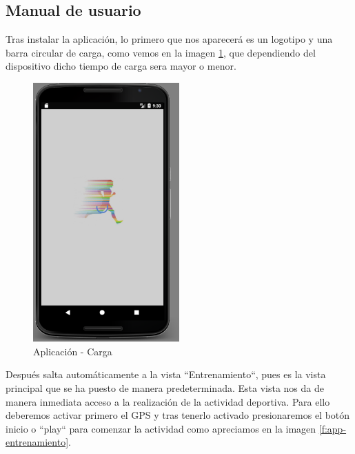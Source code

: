 \documentclass[a4paper, 11pt]{article}
\begin{document}
\begin{itemize}
\section{Manual de usuario}

  Tras instalar la aplicación, lo primero que nos aparecerá es un logotipo y una
  barra circular de carga, como vemos en la imagen  \ref{f:app-inicio}, que dependiendo
  del dispositivo dicho tiempo de carga sera mayor o menor.\\


           \begin{figure}[H]
            \centering
            \includegraphics[width=0.5\textwidth]{1inicio}
            \caption{Aplicación - Carga}
            \label{f:app-inicio}
           \end{figure}

  Después salta automáticamente a la vista ``Entrenamiento``, pues es la vista principal
  que se ha puesto de manera predeterminada. Esta vista nos da de manera inmediata acceso
  a la realización de la actividad deportiva. Para ello deberemos activar primero el GPS
  y tras tenerlo activado presionaremos el botón inicio o ``play`` para comenzar la actividad
  como apreciamos en la imagen \ref{f:app-entrenamiento}.\\


\end{itemize}
\end{document}

